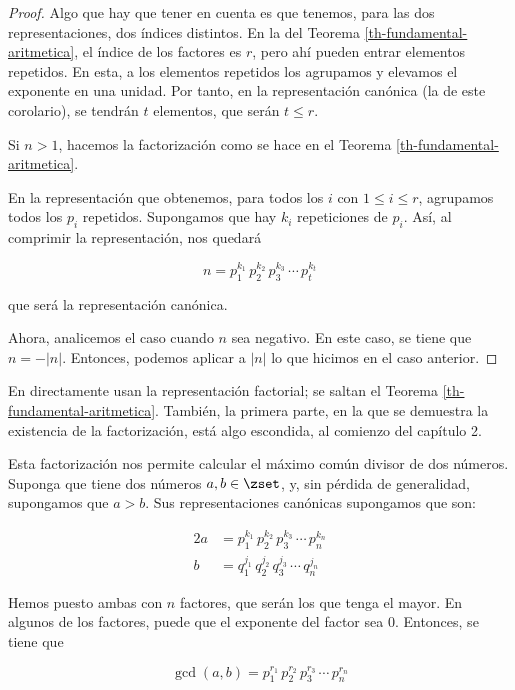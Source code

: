\begin{proof}
  Algo que hay que tener en cuenta es que tenemos, para las dos
  representaciones, dos índices distintos. En la del Teorema
  \ref{th-fundamental-aritmetica}, el índice de los factores es $r$, pero
  ahí pueden entrar elementos repetidos. En esta, a los elementos repetidos
  los agrupamos y elevamos el exponente en una unidad. Por tanto, en la
  representación canónica (la de este corolario), se tendrán $t$ elementos,
  que serán $t \leq r$.

  Si $n > 1$, hacemos la factorización como se hace en el Teorema
  \ref{th-fundamental-aritmetica}.

  En la representación que obtenemos, para todos los $i$ con $1 \leq i \leq
  r$, agrupamos todos los $p_i$ repetidos. Supongamos que hay $k_i$
  repeticiones de $p_i$. Así, al comprimir la representación, nos quedará

  $$ n = p_1^{k_1} \, p_2^{k_2} \, p_3^{k_3} \, \cdots \, p_t^{k_t} $$

  \noindent que será la representación canónica.

  Ahora, analicemos el caso cuando $n$ sea negativo. En este caso, se tiene
  que $n = {-|n|}$. Entonces, podemos aplicar a $|n|$ lo que hicimos en el
  caso anterior.
\end{proof}

En \cite{weissman} directamente usan la representación
factorial; se saltan el Teorema \ref{th-fundamental-aritmetica}. También, la
primera parte, en la que se demuestra la existencia de la factorización,
está algo escondida, al comienzo del capítulo 2.

Esta factorización nos permite calcular el máximo común divisor de dos
números. Suponga que tiene dos números $a, b \in \zset$, y, sin pérdida de
generalidad, supongamos que $a > b$. Sus representaciones canónicas
supongamos que son:

\begin{alignat*}{2}
  a &= p_1^{k_1} \, p_2^{k_2} \, p_3^{k_3} \, \cdots \, p_n^{k_n} \\
  b &= q_1^{j_1} \, q_2^{j_2} \, q_3^{j_3} \, \cdots \, q_n^{j_n}
\end{alignat*}

\noindent Hemos puesto ambas con $n$ factores, que serán los que tenga el
mayor. En algunos de los factores, puede que el exponente del factor sea 0.
Entonces, se tiene que

$$ \gcd(a, b) = p_1^{r_1} \, p_2^{r_2} \, p_3^{r_3} \, \cdots \, p_n^{r_n}
$$

